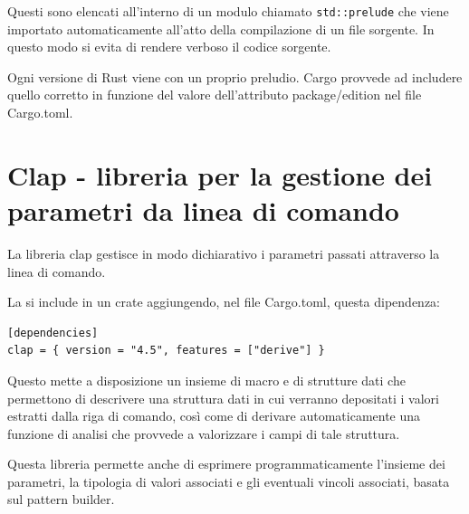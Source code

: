 Questi sono elencati all'interno di un modulo chiamato \texttt{std::prelude}
che viene importato automaticamente all'atto della compilazione di un file sorgente.
In questo modo si evita di rendere verboso il codice sorgente.


Ogni versione di Rust viene con un proprio preludio. Cargo provvede ad
includere quello corretto in funzione del valore dell'attributo package/edition
nel file Cargo.toml.


\section{Clap - libreria per la gestione dei parametri da linea di comando}

La libreria clap gestisce in modo dichiarativo i parametri passati attraverso la
linea di comando.

La si include in un crate aggiungendo, nel file Cargo.toml, questa dipendenza:

\begin{verbatim}
[dependencies]
clap = { version = "4.5", features = ["derive"] }
\end{verbatim}


Questo mette a disposizione un insieme di macro e di strutture dati che
permettono di descrivere una struttura dati in cui verranno depositati i valori
estratti dalla riga di comando, così come di derivare automaticamente una
funzione di analisi che provvede a valorizzare i campi di tale struttura.

Questa libreria permette anche di esprimere programmaticamente l'insieme dei
parametri, la tipologia di valori associati e gli eventuali vincoli associati, basata
sul pattern builder.


